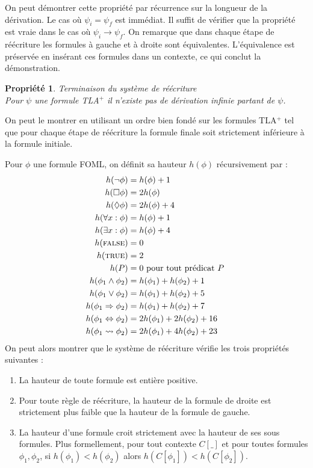 \documentclass[12pt]{article}
\newcommand{\TRUE}{\textsc{true}}
\newcommand{\FALSE}{\textsc{false}}
\newtheorem{prop}{Propriété}
\begin{document}
On peut démontrer cette propriété par récurrence sur la longueur de la dérivation.
Le cas où $\psi_i = \psi_f$ est immédiat. Il suffit de vérifier que la propriété est vraie dans le cas où $\psi_i \longrightarrow \psi_f$.
On remarque que dans chaque étape de réécriture les formules à gauche et à droite sont équivalentes.
L'équivalence est préservée en insérant ces formules dans un contexte,
ce qui conclut la démonstration.


\begin{prop} \emph{Terminaison du système de réécriture} \\
  Pour $\psi$ une formule TLA$^+$ il n'existe pas de dérivation infinie partant de $\psi$.
\end{prop}

On peut le montrer en utilisant un ordre bien fondé sur les formules TLA$^+$ tel que pour chaque étape de réécriture la formule finale soit strictement inférieure à la formule initiale.

Pour $\phi$ une formule FOML, on définit sa hauteur \( h(\phi) \) récursivement par :
\begin{align*}
  h(\neg \phi) & = h(\phi) + 1 \\
  h(\Box \phi) & = 2h(\phi) \\
  h(\Diamond \phi) & = 2h(\phi) + 4 \\
  h(\forall x : \phi) & = h(\phi) + 1 \\
  h(\exists x : \phi) & = h(\phi) + 4 \\
  h(\FALSE) & = 0 \\
  h(\TRUE) & = 2 \\
  h(P) & = 0 \textup{ pour tout prédicat \(P\) } \\
  h(\phi_1 \land \phi_2) & = h(\phi_1) + h(\phi_2) + 1\\
  h(\phi_1 \lor \phi_2) & = h(\phi_1) + h(\phi_2) + 5\\
  h(\phi_1 \Rightarrow \phi_2) & = h(\phi_1) + h(\phi_2) + 7\\
  h(\phi_1 \Leftrightarrow \phi_2) & = 2h(\phi_1) + 2h(\phi_2) + 16\\
  h(\phi_1 \leadsto \phi_2) & = 2h(\phi_1) + 4h(\phi_2) + 23
\end{align*}
On peut alors montrer que le système de réécriture vérifie les trois propriétés suivantes :
\begin{enumerate}
\item La hauteur de toute formule est entière positive.
\item Pour toute règle de réécriture, la hauteur de la formule de droite est strictement plus faible que la hauteur de la formule de gauche.
\item La hauteur d'une formule croit strictement avec la hauteur de ses sous formules.
  Plus formellement, pour tout contexte \( C[\_] \) et pour toutes formules \( \phi_1, \phi_2 \), si \( h(\phi_1) < h(\phi_2) \) alors \( h(C[\phi_1]) < h(C[\phi_2]) \).
\end{enumerate}
\end{document}
